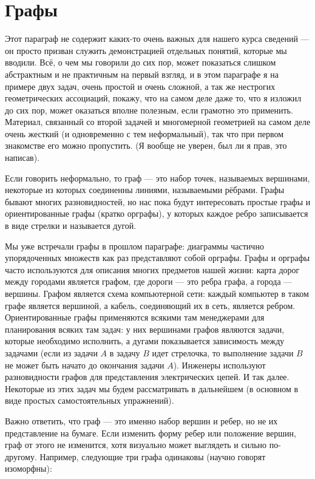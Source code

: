 \section{Графы}

Этот параграф не содержит каких-то очень важных для нашего курса сведений — он просто призван служить демонстрацией отдельных понятий, которые мы вводили. Всё, о чем мы говорили до сих пор, может показаться слишком абстрактным и не практичным на первый взгляд, и в этом параграфе я на примере двух задач, очень простой и очень сложной, а так же нестрогих геометрических ассоциаций, покажу, что на самом деле даже то, что я изложил до сих пор, может оказаться вполне полезным, если грамотно это применить. Материал, связанный со второй задачей и многомерной геометрией на самом деле очень жесткий (и одновременно с тем неформальный), так что при первом знакомстве его можно пропустить. (Я вообще не уверен, был ли я прав, это написав).

Если говорить неформально, то граф — это набор точек, называемых вершинами, некоторые из которых соединенны линиями, называемыми рёбрами. Графы бывают многих разновидностей, но нас пока будут интересовать простые графы и ориентированные графы (кратко орграфы), у которых каждое ребро записывается в виде стрелки и называется дугой.

Мы уже встречали графы в прошлом параграфе: диаграммы частично упорядоченных множеств как раз представляют собой орграфы. Графы и орграфы часто используются для описания многих предметов нашей жизни: карта дорог между городами является графом, где дороги — это ребра графа, а города — вершины. Графом является схема компьютерной сети: каждый компьютер в таком графе является вершиной, а кабель, соединяющий их в сеть, является ребром. Ориентированные графы применяются всякими там менеджерами для планирования всяких там задач: у них вершинами графов являются задачи, которые необходимо исполнить, а дугами показывается зависимость между задачами (если из задачи $A$ в задачу $B$ идет стрелочка, то выполнение задачи $B$ не может быть начато до окончания задачи $A$). Инженеры используют разновидности графов для представления электрических цепей. И так далее. Некоторые из этих задач мы будем рассматривать в дальнейшем (в основном в виде простых самостоятельных упражнений).

Важно ответить, что граф — это именно набор вершин и ребер, но не их представление на бумаге. Если изменить форму ребер или положение вершин, граф от этого не изменится, хотя визуально может выглядеть и сильно по-другому. Например, следующие три графа одинаковы (научно говорят изоморфны):

